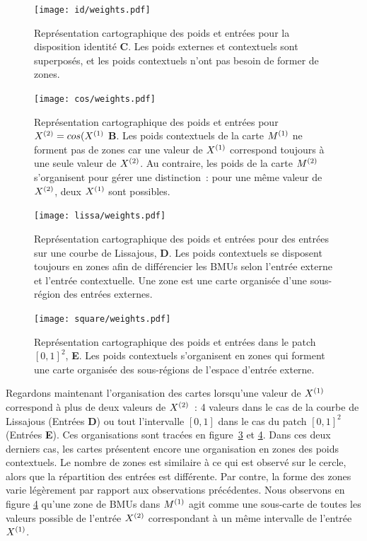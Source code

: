 \documentclass[../main]{subfiles}
\begin{document}
\begin{figure}[H]
	\centering\texttt{[image: id/weights.pdf]}
	\vspace{-0.3cm}
	\caption{Représentation cartographique des poids et entrées pour la disposition identité \textbf{C}. Les poids externes et contextuels sont superposés, et les poids contextuels n'ont pas besoin de former de zones. \label{fig:id_results}}
\end{figure}


\begin{figure}[H]
	\centering\texttt{[image: cos/weights.pdf]}
	\vspace{-0.3cm}
\caption{Représentation cartographique des poids et entrées pour $X^{({2})} = cos(X^{({1})}$ \textbf{B}. Les poids contextuels de la carte $M^{({1})}$ ne forment pas de zones car une valeur de $X^{({1})}$ correspond toujours à une seule valeur de $X^{({2})}$. Au contraire, les poids de la carte $M^{({2})}$ s'organisent pour gérer une distinction~: pour une même valeur de $X^{({2})}$, deux $X^{({1})}$ sont possibles. \label{fig:cos_results}}
\end{figure}
\begin{figure}[H]
	\centering\texttt{[image: lissa/weights.pdf]}
	\vspace{-0.3cm}
	\caption{Représentation cartographique des poids et entrées pour des entrées sur une courbe de Lissajous, \textbf{D}.
	Les poids contextuels se disposent toujours en zones afin de différencier les BMUs selon l'entrée externe et l'entrée contextuelle.
	Une zone est une carte organisée d'une sous-région des entrées externes. \label{fig:lissa}}
\end{figure}

\begin{figure}[H]
	\centering\texttt{[image: square/weights.pdf]}
	\caption{Représentation cartographique des poids et entrées dans le patch $[0,1]^2$, \textbf{E}. Les poids contextuels s'organisent en zones qui forment une carte organisée des sous-régions de l'espace d'entrée externe. \label{fig:ind}}
\end{figure}

Regardons maintenant l'organisation des cartes lorsqu'une valeur de $X^{({1})}$ correspond à plus de deux valeurs de $X^{({2})}$~: 4 valeurs dans le cas de la courbe de Lissajous (Entrées \textbf{D}) ou tout l'intervalle $[0,1]$ dans le cas du patch $[0,1]^2$ (Entrées \textbf{E}). 
Ces organisations sont tracées en figure~\ref{fig:lissa} et \ref{fig:ind}.
Dans ces deux derniers cas, les cartes présentent encore une organisation en zones des poids contextuels.
Le nombre de zones est similaire à ce qui est observé sur le cercle, alors que la répartition des entrées est différente. 
Par contre, la forme des zones varie légèrement par rapport aux observations précédentes.
Nous observons en figure \ref{fig:ind} qu'une zone de BMUs dans $M^{({1})}$ agit comme une \og sous-carte \fg de toutes les valeurs possible de l'entrée $X^{({2})}$ correspondant à un même intervalle de l'entrée  $X^{({1})}$.
\end{document}
